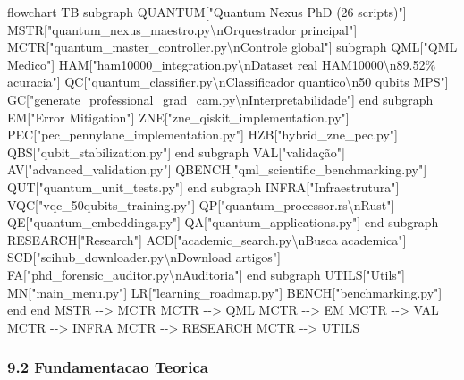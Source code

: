 \documentclass[
  12pt,
]{article}
\newenvironment{Shaded}{}{}
\newcommand{\NormalTok}[1]{#1}
\begin{document}
\begin{Shaded}
\begin{Highlighting}[]
\NormalTok{flowchart TB}
\NormalTok{subgraph QUANTUM["Quantum Nexus PhD (26 scripts)"]}
\NormalTok{MSTR["quantum\_nexus\_maestro.py\textbackslash{}nOrquestrador principal"]}
\NormalTok{MCTR["quantum\_master\_controller.py\textbackslash{}nControle global"]}
\NormalTok{subgraph QML["QML Medico"]}
\NormalTok{HAM["ham10000\_integration.py\textbackslash{}nDataset real HAM10000\textbackslash{}n89.52\% acuracia"]}
\NormalTok{QC["quantum\_classifier.py\textbackslash{}nClassificador quantico\textbackslash{}n50 qubits MPS"]}
\NormalTok{GC["generate\_professional\_grad\_cam.py\textbackslash{}nInterpretabilidade"]}
\NormalTok{end}
\NormalTok{subgraph EM["Error Mitigation"]}
\NormalTok{ZNE["zne\_qiskit\_implementation.py"]}
\NormalTok{PEC["pec\_pennylane\_implementation.py"]}
\NormalTok{HZB["hybrid\_zne\_pec.py"]}
\NormalTok{QBS["qubit\_stabilization.py"]}
\NormalTok{end}
\NormalTok{subgraph VAL["validação"]}
\NormalTok{AV["advanced\_validation.py"]}
\NormalTok{QBENCH["qml\_scientific\_benchmarking.py"]}
\NormalTok{QUT["quantum\_unit\_tests.py"]}
\NormalTok{end}
\NormalTok{subgraph INFRA["Infraestrutura"]}
\NormalTok{VQC["vqc\_50qubits\_training.py"]}
\NormalTok{QP["quantum\_processor.rs\textbackslash{}nRust"]}
\NormalTok{QE["quantum\_embeddings.py"]}
\NormalTok{QA["quantum\_applications.py"]}
\NormalTok{end}
\NormalTok{subgraph RESEARCH["Research"]}
\NormalTok{ACD["academic\_search.py\textbackslash{}nBusca academica"]}
\NormalTok{SCD["scihub\_downloader.py\textbackslash{}nDownload artigos"]}
\NormalTok{FA["phd\_forensic\_auditor.py\textbackslash{}nAuditoria"]}
\NormalTok{end}
\NormalTok{subgraph UTILS["Utils"]}
\NormalTok{MN["main\_menu.py"]}
\NormalTok{LR["learning\_roadmap.py"]}
\NormalTok{BENCH["benchmarking.py"]}
\NormalTok{end}
\NormalTok{end}
\NormalTok{MSTR {-}{-}\textgreater{} MCTR}
\NormalTok{MCTR {-}{-}\textgreater{} QML}
\NormalTok{MCTR {-}{-}\textgreater{} EM}
\NormalTok{MCTR {-}{-}\textgreater{} VAL}
\NormalTok{MCTR {-}{-}\textgreater{} INFRA}
\NormalTok{MCTR {-}{-}\textgreater{} RESEARCH}
\NormalTok{MCTR {-}{-}\textgreater{} UTILS}
\end{Highlighting}
\end{Shaded}

\subsubsection{9.2 Fundamentacao Teorica}\label{fundamentacao-teorica-8}
\end{document}

